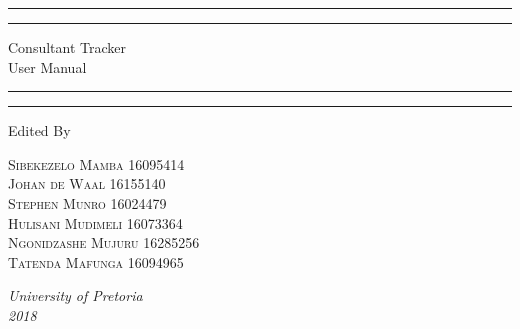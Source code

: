 \documentclass[a4paper, 12pt, oneside]{article}
\begin{document}
\begin{titlepage} %

	\centering %
	
	\scshape %
	
	\vspace*{\baselineskip} %
	
	
	\rule{\textwidth}{1.6pt}\vspace*{-\baselineskip}\vspace*{2pt} %
	\rule{\textwidth}{0.4pt} %
	
	\vspace{0.75\baselineskip} %
	
	{\LARGE Consultant Tracker\\User Manual} %
	
	\vspace{0.75\baselineskip} %
	
	\rule{\textwidth}{0.4pt}\vspace*{-\baselineskip}\vspace{3.2pt} %
	\rule{\textwidth}{1.6pt} %
	
	\vspace{2\baselineskip} %
	
	
	
	Edited By
	
	\vspace{0.5\baselineskip} %
	
	{\scshape\Large Sibekezelo Mamba 16095414 \\ Johan de Waal 16155140 \\ Stephen Munro 16024479\\ Hulisani Mudimeli 16073364 \\ Ngonidzashe Mujuru 16285256  \\ Tatenda Mafunga 16094965\\} %
	
	\vspace{0.5\baselineskip} %
	
	\textit{University of Pretoria \\2018} %
	
	\vfill %
	
\end{titlepage}
\end{document}
